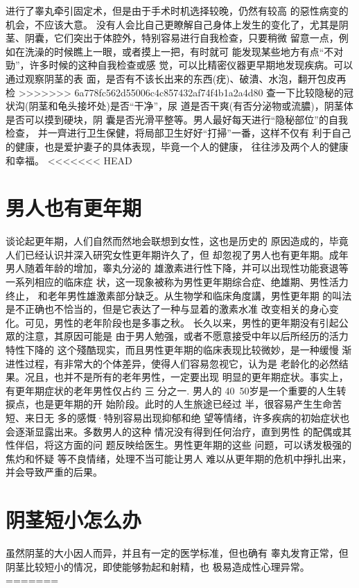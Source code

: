 \documentclass[12pt,UTF8]{ctexbook}
\begin{document}
进行了睾丸牵引固定术，但是由于手术时机选择较晚，仍然有较高
的惡性病变的机会，不应该大意。
没有人会比自己更瞭解自己身体上发生的变化了，尤其是阴
茎、阴囊，它们突出于体腔外，特别容易进行自我检查，只要稍微
留意一点，例如在洗澡的时候瞧上一眼，或者摸上一把，有时就可
能发现某些地方有点“不对勁”，许多时候的这种自我检查或感
觉，可以比精密仪器更早期地发现疾病。可以通过观察阴茎的表
面，是否有不该长出来的东西(疣)、破潰、水泡，翻开包皮再检
>>>>>>> 6a778fc562d55006c4c857432af74f4b1a2a4d80
查一下比较隐秘的冠状沟(阴茎和龟头接坏处)是否“干净”，尿
道是否干爽(有否分泌物或流膿)，阴茎体是否可以摸到硬块，阴
囊是否光滑平整等。男人最好每天进行“隐秘部位”的自我检查，
并一齊进行卫生保健，将局部卫生好好“打掃”一番，这样不仅有
利于自己的健康，也是爱护妻子的具体表现，毕竟一个人的健康，
往往涉及两个人的健康和幸福。
<<<<<<< HEAD

\section{男人也有更年期}
谈论起更年期，人们自然而然地会联想到女性，这也是历史的
原因造成的，毕竟人们已经认识并深入研究女性更年期许久了，但
却忽视了男人也有更年期。成年男人随着年龄的增加，睾丸分泌的
雄激素进行性下降，并可以出现性功能衰退等一系列相应的临床症
状，这一现象被称为男性更年期综合症、绝雄期、男性活力终止，
和老年男性雄激素部分缺乏。从生物学和临床角度講，男性更年期
的叫法是不正确也不恰当的，但是它表达了一种与显着的激素水准
改变相关的身心变化。可见，男性的老年阶段也是多事之秋。
长久以来，男性的更年期没有引起公眾的注意，其原因可能是
由于男人勉强，或者不愿意接受中年以后所经历的活力特性下降的
这个殘酷现实，而且男性更年期的临床表现比较微妙，是一种缓慢
渐进性过程，有非常大的个体差异，使得人们容易忽视它，认为是
老龄化的必然结果。况且，也并不是所有的老年男性，一定要出现
明显的更年期症状。事实上，有更年期症状的老年男性仅占约 三
分之一.
男人的 40~50岁是一个重要的人生转捩点，也是更年期的开
始阶段。此时的人生旅途已经过
半，很容易产生生命苦短、来日无
多的感慨·特别容易出现抑郁和绝
望等情绪，许多疾病的初始症状也
会逐渐显露出来。多数男人的这种
情况没有得到任何治疗，直到男性
的配偶或其性伴侣，将这方面的问
题反映给医生。男性更年期的这些
问题，可以诱发极强的焦灼和怀疑
等不良情绪，处理不当可能让男人
难以从更年期的危机中掙扎出来，
并会导致严重的后果。

\section{阴茎短小怎么办}
虽然阴茎的大小因人而异，并且有一定的医学标准，但也确有
睾丸发育正常，但阴茎比较短小的情况，即使能够勃起和射精，也
极易造成性心理异常。
=======
\end{document}
